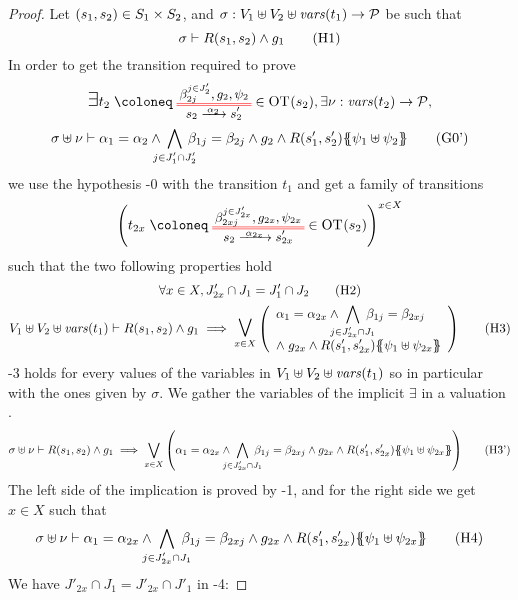 \documentclass{article}
\begin{document}
\begin{proof} Let \({\left(s_1, s_2\right)} \in S_1 \times S_2\),  and \(\sigma: V_1 \uplus V_2 \uplus \mathit{vars}{\left(t_1\right)} \to \mathcal{P}\) be such that
\[ \sigma \vdash R\mpar{s_1, s_2} \wedge g_1 \hyp{1} \]
In order to get the transition required to prove
\begin{multline}
	\bigsymb{\exists} t_2 \defobject \OTx{2}{}{2}{2} \in \fOT{s_2}, \exists \nu: \fvars{t_2} \to \values, \\
	\sigma \uplus \nu \vdash \alpha_1 = \alpha_2 \wedge \bigwedge_\subbox{j \in J'_1 \cap J'_2} \beta_{1j} = \beta_{2j} \wedge g_2 \wedge R\mpar{s'_1, s'_2}\psubst{\psi_1 \uplus \psi_2} \goal{0'}
\end{multline}
we use the hypothesis \hyp{0} with the transition \(t_1\) and get a family of transitions
\[ \mpar{t_{2x} \defobject \OTx{2}{x}{2x}{2x} \in \fOT{s_2}}^{x \in X} \]
such that the two following properties hold
\begin{gather}
	\forall x \in X, J'_{2x} \cap J_1 = J'_1 \cap J_2 \hyp{2} \\
	V_1 \uplus V_2 \uplus \fvars{t_1} \vdash R\mpar{s_1, s_2} \wedge g_1 \implies \operatorname*{\bigsymb{\bigvee}}_{x \in X} \mpar{\everymath{\displaystyle}\begin{array}{l}
		\alpha_1 = \alpha_{2x} \wedge \bigwedge_\subbox{j \in J'_{2x} \cap J_1} \beta_{1j} = \beta_{2xj} \\[12pt]
		\nwedge g_{2x} \wedge R\mpar{s'_1, s'_{2x}}\psubst{\psi_1 \uplus \psi_{2x}}
	\end{array}} \hyp{3}
\end{gather}
\hyp{3} holds for every values of the variables in \(V_1 \uplus V_2 \uplus \mathit{vars}{\left(t_1\right)}\) so in particular with the ones given by \(\sigma\).
We gather the variables of the implicit \(\exists\) in a valuation .
\[ \sigma \uplus \nu \vdash R\mpar{s_1, s_2} \wedge g_1 \implies \bigvee_{x \in X} \mpar{\alpha_1 = \alpha_{2x} \wedge \bigwedge_\subbox{j \in J'_{2x} \cap J_1} \beta_{1j} = \beta_{2xj} \wedge g_{2x} \wedge R\mpar{s'_1, s'_{2x}}\psubst{\psi_1 \uplus \psi_{2x}}} \hyp{3'} \]
The left side of the implication is proved by \hyp{1}, and for the right side we get \(x \in X\) such that
\[ \sigma \uplus \nu \vdash \alpha_1 = \alpha_{2x} \wedge \bigwedge_\subbox{j \in J'_{2x} \cap J_1} \beta_{1j} = \beta_{2xj} \wedge g_{2x} \wedge R\mpar{s'_1, s'_{2x}}\psubst{\psi_1 \uplus \psi_{2x}} \hyp{4} \]
We have \(J'_{2x} \cap J_1 = J'_{2x} \cap J'_1\) in \hyp{4}:

\end{proof}
\end{document}
